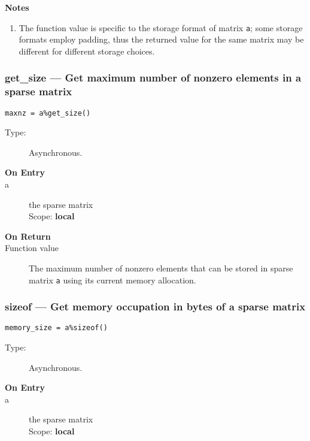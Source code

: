 {\par\noindent\bfseries Notes}
\begin{enumerate}
\item The function value is specific to the storage format of matrix
  \verb|a|; some storage formats employ padding, thus the returned
  value for the same matrix may be different for different storage choices.
\end{enumerate}

\subsubsection*{get\_size  --- Get maximum number of nonzero elements
  in a sparse matrix}

\begin{verbatim}
maxnz = a%get_size()
\end{verbatim}

\begin{description}
\item[Type:] Asynchronous.
\item[\bf On Entry]
\item[a] the sparse matrix\\
Scope: {\bf local}\\
\end{description}

\begin{description}
\item[\bf On Return]
\item[Function value] The maximum number of nonzero elements that can
  be stored in sparse matrix \verb|a| using its current memory allocation.
\end{description}

\subsubsection*{sizeof  --- Get memory occupation in bytes
of  a sparse matrix}

\begin{verbatim}
memory_size = a%sizeof()
\end{verbatim}

\begin{description}
\item[Type:] Asynchronous.
\item[\bf On Entry]
\item[a] the sparse matrix\\
Scope: {\bf local}\\
\end{description}

